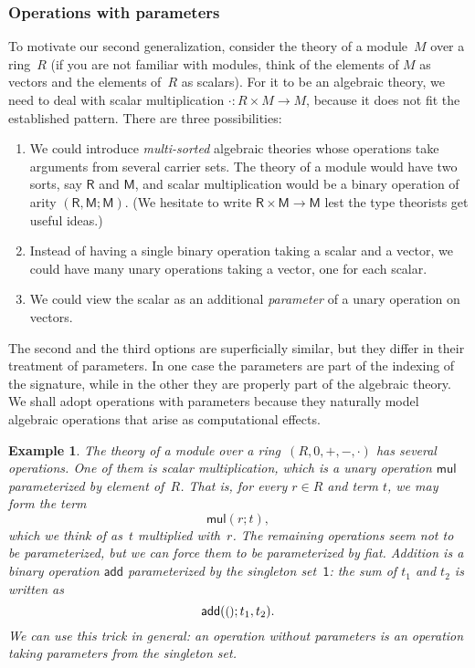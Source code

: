 \documentclass{amsart}
\newcommand{\one}{\mathsf{1}} %
\newcommand{\unit}{{\text{\small$()$}}} %
\newtheorem{example}[definition]{Example}
\begin{document}
\subsubsection{Operations with parameters}
\label{sec:oper-with-param}

To motivate our second generalization, consider the theory of a module~$M$ over
a ring~$R$ (if you are not familiar with modules, think of the elements of $M$
as vectors and the elements of~$R$ as scalars). For it to be an algebraic
theory, we need to deal with scalar multiplication ${\cdot} : R \times M \to M$,
because it does not fit the established pattern. There are three possibilities:
%
\begin{enumerate}
\item We could introduce \emph{multi-sorted} algebraic theories whose operations
  take arguments from several carrier sets. The theory of a module would have
  two sorts, say $\mathsf{R}$ and $\mathsf{M}$, and scalar multiplication would
  be a binary operation of arity $(\mathsf{R}, \mathsf{M}; \mathsf{M})$. (We
  hesitate to write $\mathsf{R} \times \mathsf{M} \to \mathsf{M}$ lest the type
  theorists get useful ideas.)
\item Instead of having a single binary operation taking a scalar and a vector,
  we could have many unary operations taking a vector, one for each scalar.
\item We could view the scalar as an additional \emph{parameter} of a
  unary operation on vectors.
\end{enumerate}
%
The second and the third options are superficially similar, but they differ in
their treatment of parameters. In one case the parameters are part of the
indexing of the signature, while in the other they are properly part of the
algebraic theory. We shall adopt operations with parameters because they
naturally model algebraic operations that arise as computational effects.

\begin{example}
  The theory of a module over a ring~$(R, 0, {+}, {-}, {\cdot})$ has several
  operations. One of them is scalar multiplication, which is a \emph{unary}
  operation $\mathsf{mul}$ parameterized by element of~$R$. That is, for every
  $r \in R$ and term $t$, we may form the term
  \begin{equation*}
    \mathsf{mul}(r; t),
  \end{equation*}
  which we think of as~$t$ multiplied with~$r$. The remaining operations seem
  not to be parameterized, but we can force them to be parameterized by fiat.
  Addition is a binary operation $\mathsf{add}$ parameterized by the singleton
  set~$\one$: the sum of $t_1$ and $t_2$ is written as
  \begin{equation*}
    \mathsf{add}(\unit; t_1, t_2).
  \end{equation*}
  We can use this trick in general: an operation without parameters is an
  operation taking parameters from the singleton set.
\end{example}
\end{document}
